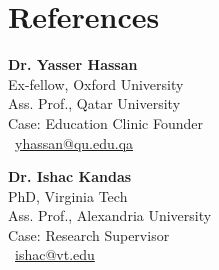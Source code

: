 \documentclass[letterpaper,11pt]{article}
\begin{document}
\section{References}
\begin{multicols}{2}
  \textbf{Dr. Yasser Hassan} \vspace{-3pt}\\ 
  Ex-fellow, Oxford University \vspace{-3pt}\\
  Ass. Prof., Qatar University \vspace{-3pt}\\
  Case: Education Clinic Founder \vspace{-3pt}\\
  \faEnvelope \ \href{mailto:yhassan@qu.edu.qa}{yhassan@qu.edu.qa}

  \columnbreak

  \textbf{Dr. Ishac Kandas} \vspace{-3pt}\\
  PhD, Virginia Tech \vspace{-3pt}\\
  Ass. Prof., Alexandria University \vspace{-3pt}\\
  Case: Research Supervisor \vspace{-3pt}\\
  \faEnvelope \ \href{mailto:ishac@vt.edu}{ishac@vt.edu}

\begin{comment}
    \columnbreak

  \textbf{Dr. X}\\
  PhD, McMaster University\\
  Ass. Professor, Alexandria University\\
  Case: Graduation Project Supervisor\\
  \faEnvelope \ \href{mailto:x@alexu.edu.eg}{x@alexu.edu.eg}
  
\end{comment}
  
\end{multicols}
\end{document}

